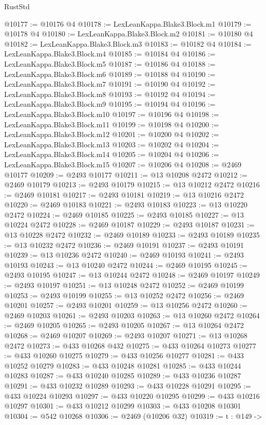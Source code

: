 \begin{lexlean}{RustStd}
\begin{coremodule}
@10177 := @10176 @4
@10178 := LexLeanKappa.Blake3.Block.m1
@10179 := @10178 @4
@10180 := LexLeanKappa.Blake3.Block.m2
@10181 := @10180 @4
@10182 := LexLeanKappa.Blake3.Block.m3
@10183 := @10182 @4
@10184 := LexLeanKappa.Blake3.Block.m4
@10185 := @10184 @4
@10186 := LexLeanKappa.Blake3.Block.m5
@10187 := @10186 @4
@10188 := LexLeanKappa.Blake3.Block.m6
@10189 := @10188 @4
@10190 := LexLeanKappa.Blake3.Block.m7
@10191 := @10190 @4
@10192 := LexLeanKappa.Blake3.Block.m8
@10193 := @10192 @4
@10194 := LexLeanKappa.Blake3.Block.m9
@10195 := @10194 @4
@10196 := LexLeanKappa.Blake3.Block.m10
@10197 := @10196 @4
@10198 := LexLeanKappa.Blake3.Block.m11
@10199 := @10198 @4
@10200 := LexLeanKappa.Blake3.Block.m12
@10201 := @10200 @4
@10202 := LexLeanKappa.Blake3.Block.m13
@10203 := @10202 @4
@10204 := LexLeanKappa.Blake3.Block.m14
@10205 := @10204 @4
@10206 := LexLeanKappa.Blake3.Block.m15
@10207 := @10206 @4
@10208 := @2469 @10177
@10209 := @2493 @10177
@10211 := @13 @10208 @2472
@10212 := @2469 @10179
@10213 := @2493 @10179
@10215 := @13 @10212 @2472
@10216 := @2469 @10181
@10217 := @2493 @10181
@10219 := @13 @10216 @2472
@10220 := @2469 @10183
@10221 := @2493 @10183
@10223 := @13 @10220 @2472
@10224 := @2469 @10185
@10225 := @2493 @10185
@10227 := @13 @10224 @2472
@10228 := @2469 @10187
@10229 := @2493 @10187
@10231 := @13 @10228 @2472
@10232 := @2469 @10189
@10233 := @2493 @10189
@10235 := @13 @10232 @2472
@10236 := @2469 @10191
@10237 := @2493 @10191
@10239 := @13 @10236 @2472
@10240 := @2469 @10193
@10241 := @2493 @10193
@10243 := @13 @10240 @2472
@10244 := @2469 @10195
@10245 := @2493 @10195
@10247 := @13 @10244 @2472
@10248 := @2469 @10197
@10249 := @2493 @10197
@10251 := @13 @10248 @2472
@10252 := @2469 @10199
@10253 := @2493 @10199
@10255 := @13 @10252 @2472
@10256 := @2469 @10201
@10257 := @2493 @10201
@10259 := @13 @10256 @2472
@10260 := @2469 @10203
@10261 := @2493 @10203
@10263 := @13 @10260 @2472
@10264 := @2469 @10205
@10265 := @2493 @10205
@10267 := @13 @10264 @2472
@10268 := @2469 @10207
@10269 := @2493 @10207
@10271 := @13 @10268 @2472
@10273 := @433 @10268 @432
@10275 := @433 @10264 @10273
@10277 := @433 @10260 @10275
@10279 := @433 @10256 @10277
@10281 := @433 @10252 @10279
@10283 := @433 @10248 @10281
@10285 := @433 @10244 @10283
@10287 := @433 @10240 @10285
@10289 := @433 @10236 @10287
@10291 := @433 @10232 @10289
@10293 := @433 @10228 @10291
@10295 := @433 @10224 @10293
@10297 := @433 @10220 @10295
@10299 := @433 @10216 @10297
@10301 := @433 @10212 @10299
@10303 := @433 @10208 @10301
@10304 := @542 @10268
@10306 := @2469 (@10206 @32)
@10319 := {t : @149} ->

\end{coremodule}
\end{lexlean}
